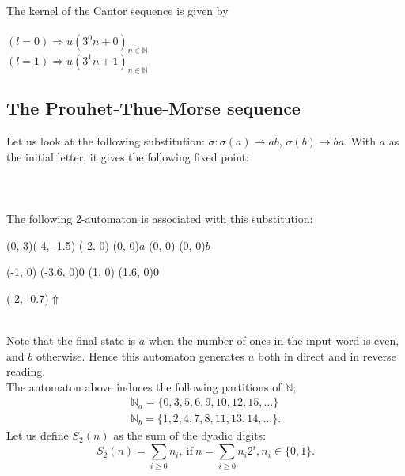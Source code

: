 \documentclass{article}
\begin{document}
\begin{example} \label{ex:k-kern}
The kernel of the Cantor sequence is given by\\
\\
$(l = 0) \Rightarrow u(3^0 n + 0)_{n \in \mathbb{N}}$\\
$(l = 1) \Rightarrow u(3^1 n + 1)_{n \in \mathbb{N}}$\\
\end{example}

\subsection{The Prouhet-Thue-Morse sequence}
Let us look at the following substitution: $\sigma: \sigma(a) \to ab$,
$\sigma(b) \to ba$. With $a$ as the initial letter, it gives the
following fixed point:\\
\\
\\
\\
The following 2-automaton is associated with this substitution:\\
\begin{graph}(0, 3)(-4, -1.5)
  (-2, 0) (0, 0){$a$}
  (0, 0)  (0, 0){$b$}

  (-1, 0) \freetext(-3.6, 0){0}
   
   
  (1, 0) \freetext(1.6, 0){0}

  \freetext(-2, -0.7){$\Uparrow$}
\end{graph}\\
Note that the final state is $a$ when the number of ones in the input word
is even, and $b$ otherwise. Hence this automaton generates $u$ both in direct
and in reverse reading.\\
The automaton above induces the following partitions of $\mathbb{N}$; 
\begin{eqnarray*}
\mathbb{N}_a = \{0, 3, 5, 6, 9, 10, 12, 15, \ldots\}\\
\mathbb{N}_b = \{1, 2, 4, 7, 8, 11, 13, 14, \ldots\}.
\end{eqnarray*}
Let us define $S_2(n)$ as the sum of the dyadic digits:
\begin{displaymath}
S_2(n) = \sum_{i \ge 0}n_i,\mathrm{\ if\ }
n = \sum_{i \ge 0}n_i2^i, n_i \in \{0, 1\}.
\end{displaymath}
\end{document}
